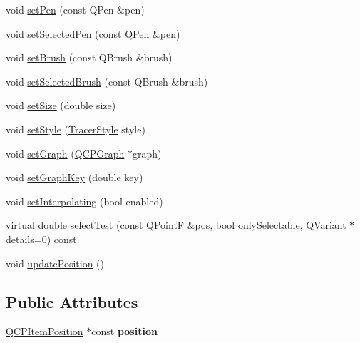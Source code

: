 \begin{DoxyCompactItemize}
\item 
void \hyperlink{class_q_c_p_item_tracer_af8048636fc1ef0152e51809b008df2ca}{set\+Pen} (const Q\+Pen \&pen)
\item 
void \hyperlink{class_q_c_p_item_tracer_ae1bf70db7f13f928660168cd3e5069f3}{set\+Selected\+Pen} (const Q\+Pen \&pen)
\item 
void \hyperlink{class_q_c_p_item_tracer_a2c303f7470a30084daa201ed556b3c36}{set\+Brush} (const Q\+Brush \&brush)
\item 
void \hyperlink{class_q_c_p_item_tracer_a0f55c084980a7a312af859d3e7b558ef}{set\+Selected\+Brush} (const Q\+Brush \&brush)
\item 
void \hyperlink{class_q_c_p_item_tracer_ae47fe0617f5fef5fdb766999569be10a}{set\+Size} (double size)
\item 
void \hyperlink{class_q_c_p_item_tracer_a41a2ac4f1acd7897b4e2a2579c03204e}{set\+Style} (\hyperlink{class_q_c_p_item_tracer_a2f05ddb13978036f902ca3ab47076500}{Tracer\+Style} style)
\item 
void \hyperlink{class_q_c_p_item_tracer_af5886f4ded8dd68cb4f3388f390790c0}{set\+Graph} (\hyperlink{class_q_c_p_graph}{Q\+C\+P\+Graph} $\ast$graph)
\item 
void \hyperlink{class_q_c_p_item_tracer_a6840143b42f3b685cedf7c6d83a704c8}{set\+Graph\+Key} (double key)
\item 
void \hyperlink{class_q_c_p_item_tracer_a6c244a9d1175bef12b50afafd4f5fcd2}{set\+Interpolating} (bool enabled)
\item 
virtual double \hyperlink{class_q_c_p_item_tracer_ae1dc728384936184e7552a6d0d67fd75}{select\+Test} (const Q\+PointF \&pos, bool only\+Selectable, Q\+Variant $\ast$details=0) const
\item 
void \hyperlink{class_q_c_p_item_tracer_a5b90296109e36384aedbc8908a670413}{update\+Position} ()
\end{DoxyCompactItemize}
\subsection*{Public Attributes}
\begin{DoxyCompactItemize}
\item 
\hypertarget{class_q_c_p_item_tracer_a69917e2fdb2b3a929c196958feee7cbe}{}\label{class_q_c_p_item_tracer_a69917e2fdb2b3a929c196958feee7cbe} 
\hyperlink{class_q_c_p_item_position}{Q\+C\+P\+Item\+Position} $\ast$const {\bfseries position}
\end{DoxyCompactItemize}
